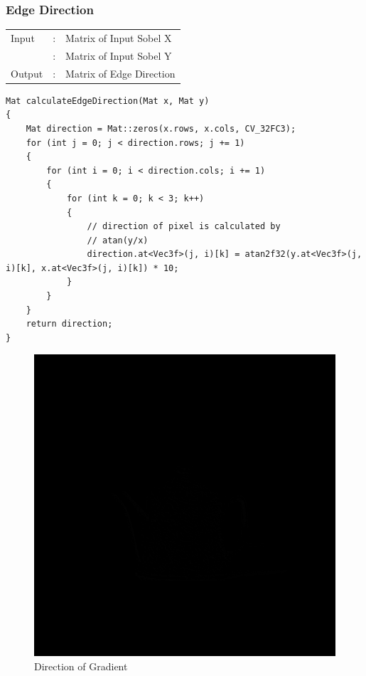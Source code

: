 \documentclass[12pt,a4paper]{report}
\begin{document}
\subsubsection{Edge Direction}
\begin{tabular}{lll}
    Input  & : & Matrix of Input Sobel X  \\
           & : & Matrix of Input Sobel Y  \\
    Output & : & Matrix of Edge Direction \\
\end{tabular}
\begin{lstlisting}
Mat calculateEdgeDirection(Mat x, Mat y)
{
    Mat direction = Mat::zeros(x.rows, x.cols, CV_32FC3);
    for (int j = 0; j < direction.rows; j += 1)
    {
        for (int i = 0; i < direction.cols; i += 1)
        {
            for (int k = 0; k < 3; k++)
            {
                // direction of pixel is calculated by
                // atan(y/x)
                direction.at<Vec3f>(j, i)[k] = atan2f32(y.at<Vec3f>(j, i)[k], x.at<Vec3f>(j, i)[k]) * 10;
            }
        }
    }
    return direction;
}
\end{lstlisting}
\begin{figure}[!htb]
    \centering
      \includegraphics[height=0.4\paperheight]{output/direction.jpg}
    \caption{Direction of Gradient}
\end{figure}
\clearpage
\end{document}
